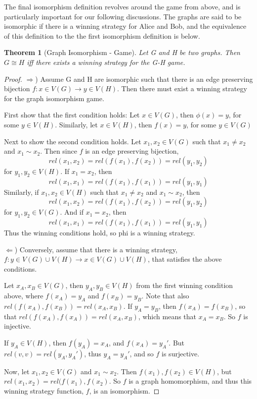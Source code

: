 \documentclass[12pt]{article}
\newtheorem{thm}{Theorem}[section]
\begin{document}
The final isomorphism definition revolves around the game from above, and is particularly important for our following discussions. The graphs are said to be isomorphic if there is a winning strategy for Alice and Bob, and the equivalence of this definition to the the first isomorphism definition is below.

\begin{thm}[Graph Isomorphism - Game]
\label{game}
Let G and H be two graphs. Then $G \cong H$ iff there exists a winning strategy for the G-H game.
\end{thm}

\begin{proof}
$\Rightarrow$) Assume G and H are isomorphic such that there is an edge preserving bijection $f: x \in V(G) \to y \in V(H)$. Then there must exist a winning strategy for the graph isomorphism game. 

First show that the first condition holds: Let $x \in V(G)$, then $\phi(x) = y$, for some $y \in V(H)$. Similarly, let $x \in V(H)$, then $f(x) = y$, for some $y \in V(G)$

Next to show the second condition holds. Let $x_1, x_2 \in V(G)$ such that $x_1 \neq x_2$ and $x_1 \sim x_2$. Then since $f$ is an edge preserving bijection, 
\begin{equation}
rel(x_1, x_2) = rel(f(x_1), f(x_2)) = rel(y_1, y_2)
\end{equation}
for $y_1, y_2 \in V(H)$. If $x_1 = x_2$, then 
\begin{equation}
rel(x_1, x_1) = rel(f(x_1), f(x_1)) = rel(y_1, y_1)
\end{equation}
Similarly, if $x_1, x_2 \in V(H)$ such that $x_1 \neq x_2$ and $x_1 \sim x_2$, then  
\begin{equation}
rel(x_1, x_2) = rel(f(x_1), f(x_2)) = rel(y_1, y_2)
\end{equation}
for $y_1, y_2 \in V(G)$. And if $x_1 = x_2$, then 
\begin{equation}
rel(x_1, x_1) = rel(f(x_1), f(x_1)) = rel(y_1, y_1)
\end{equation}
Thus the winning conditions hold, so phi is a winning strategy.

$\Leftarrow$) Conversely, assume that there is a winning strategy, $f: y \in V(G)\cup V(H) \to x \in V(G) \cup V(H)$, that satisfies the above conditions. 

Let $x_A, x_B \in V(G)$, then $y_A, y_B \in V(H)$ from the first winning condition above, where $f(x_A) = y_A$ and $f(x_B) = y_B$. Note that also $rel(f(x_A), f(x_B)) = rel(x_A, x_B)$. If $y_A = y_B$, then $f(x_A) = f(x_B)$, so that $rel(f(x_A), f(x_A)) = rel(x_A, x_B)$, which means that $x_A = x_B$. So $f$ is injective. 

If $y_A \in V(H)$, then $f(y_A) = x_A$, and $f(x_A) = y_A'$. But $rel(v, v) = rel(y_A, y_A')$, thus $y_A = y_A'$, and so $f$ is surjective. 

Now, let $x_1, x_2 \in V(G)$ and $x_1 \sim x_2$. Then $f(x_1), f(x_2) \in V(H)$, but $rel(x_1, x_2) = rel(f(x_1), f(x_2)$. So $f$ is a  graph homomorphism, and thus this winning strategy function, $f$, is an isomorphism.

\end{proof}
\end{document}
